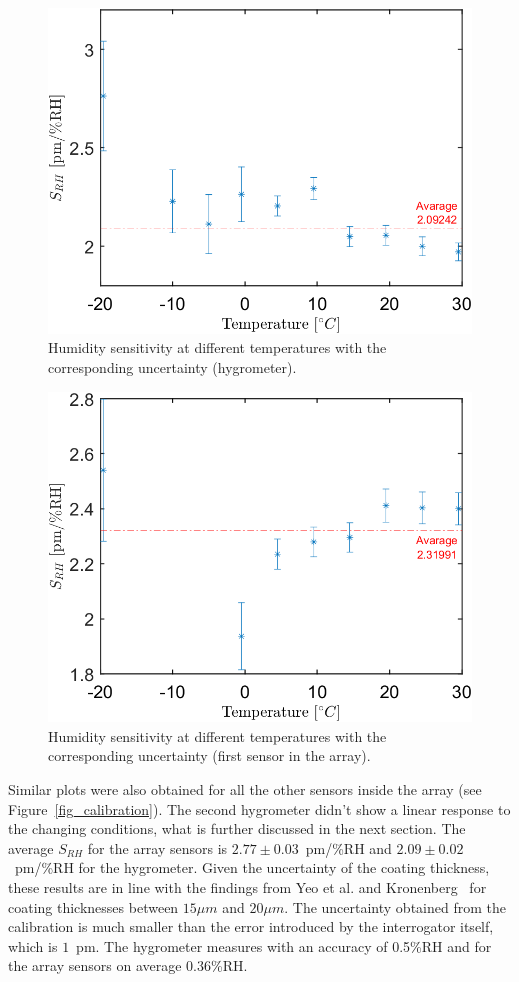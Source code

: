 \begin{figure}[!h]
\centering
\includegraphics[width=0.55\columnwidth]{Chapter5/images/RHS_RH.png}
\caption{Humidity sensitivity at different temperatures with the corresponding uncertainty (hygrometer).}
\label{fig_RH_sens}
\end{figure}
\begin{figure}[!h]
\centering
\includegraphics[width=0.55\columnwidth]{Chapter5/images/RH1_RH.png}
\caption{Humidity sensitivity at different temperatures with the corresponding uncertainty (first sensor in the array).}
\label{fig_RH_sens2}
\end{figure}

Similar plots were also obtained for all the other sensors inside the array (see Figure~\ref{fig_calibration}). The second hygrometer didn't show a linear response to the changing conditions, what is further discussed in the next section.
\newpage
The average $S_{RH}$ for the array sensors is $2.77\pm0.03$~pm/\%RH  and $2.09\pm0.02$~pm/\%RH for the hygrometer. Given the uncertainty of the coating thickness, these results are in line with the findings from Yeo et al. and Kronenberg~\cite{Kronenberg:02,YEO_PI} for coating thicknesses between $15\mu m$ and $20\mu m$. The uncertainty obtained from the calibration is much smaller than the error introduced by the interrogator itself, which is $1$~pm. The hygrometer measures with an accuracy of 0.5\%RH and for the array sensors on average $0.36$\%RH. 

